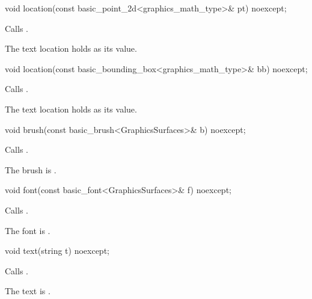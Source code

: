 %
\begin{itemdecl}
void location(const basic_point_2d<graphics_math_type>& pt) noexcept;
\end{itemdecl}
\begin{itemdescr}
\pnum
\effects Calls .

\pnum
\remarks The text location holds  as its value.
\end{itemdescr}

%
\begin{itemdecl}
void location(const basic_bounding_box<graphics_math_type>& bb) noexcept;
\end{itemdecl}
\begin{itemdescr}
\pnum
\effects Calls .

\pnum
\remarks The text location holds  as its value.
\end{itemdescr}

%
\begin{itemdecl}
void brush(const basic_brush<GraphicsSurfaces>& b) noexcept;
\end{itemdecl}
\begin{itemdescr}
\pnum
\effects Calls .

\pnum
\remarks The brush is .
\end{itemdescr}

%
\begin{itemdecl}
void font(const basic_font<GraphicsSurfaces>& f) noexcept;
\end{itemdecl}
\begin{itemdescr}
\pnum
\effects Calls .

\pnum
\remarks The font is .
\end{itemdescr}

%
\begin{itemdecl}
void text(string t) noexcept;
\end{itemdecl}
\begin{itemdescr}
\pnum
\effects Calls .

\pnum
\remarks The text is .
\end{itemdescr}

